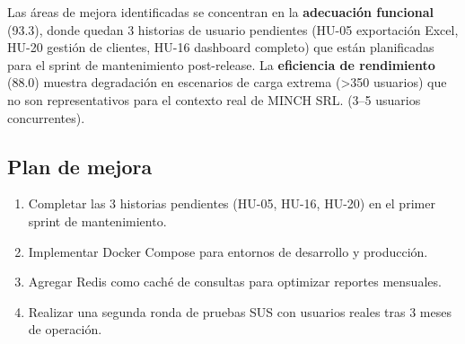 \documentclass[stu]{apa7}
\begin{document}
Las áreas de mejora identificadas se concentran en la \textbf{adecuación funcional} (93.3), donde quedan 3 historias de usuario pendientes (HU-05 exportación Excel, HU-20 gestión de clientes, HU-16 dashboard completo) que están planificadas para el sprint de mantenimiento post-release. La \textbf{eficiencia de rendimiento} (88.0) muestra degradación en escenarios de carga extrema (>350 usuarios) que no son representativos para el contexto real de MINCH SRL. (3--5 usuarios concurrentes).

\subsection{Plan de mejora}

\begin{enumerate}
    \item Completar las 3 historias pendientes (HU-05, HU-16, HU-20) en el primer sprint de mantenimiento.
    \item Implementar Docker Compose para entornos de desarrollo y producción.
    \item Agregar Redis como caché de consultas para optimizar reportes mensuales.
    \item Realizar una segunda ronda de pruebas SUS con usuarios reales tras 3 meses de operación.
\end{enumerate}
\end{document}
